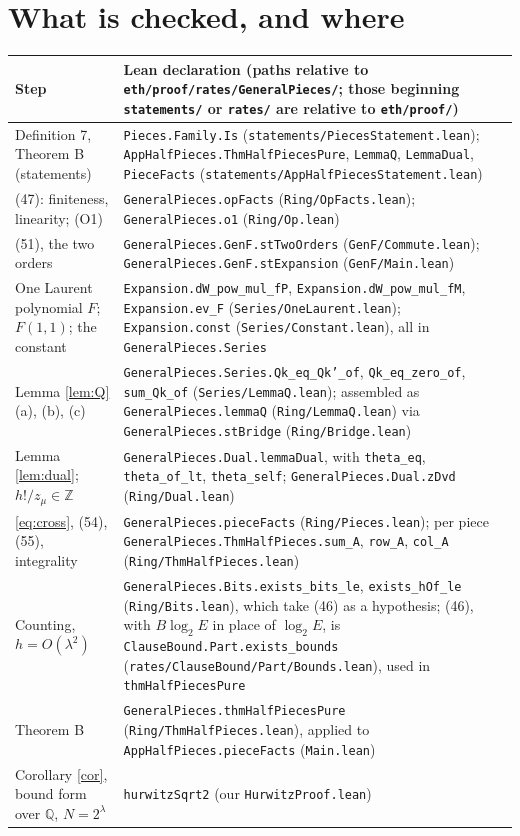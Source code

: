 \documentclass[11pt]{amsart}
\theoremstyle{remark}
\newcommand{\Q}{\mathbb{Q}}
\newcommand{\Z}{\mathbb{Z}}
\begin{document}
\section{What is checked, and where}\label{sec:map}

{\footnotesize\raggedright
\noindent\begin{tabularx}{\textwidth}{@{}>{\raggedright\arraybackslash}p{3.3cm}>{\raggedright\arraybackslash}X@{}}
\toprule
Step & Lean declaration (paths relative to \texttt{eth/proof/rates/GeneralPieces/}; those beginning \texttt{statements/} or \texttt{rates/} are relative to \texttt{eth/proof/}) \\
\midrule
Definition 7, Theorem B (statements) & \texttt{Pieces.Family.Is} (\texttt{statements/PiecesStatement.lean}); \texttt{AppHalfPieces.ThmHalfPiecesPure}, \texttt{LemmaQ}, \texttt{LemmaDual}, \texttt{PieceFacts} (\texttt{statements/AppHalfPiecesStatement.lean})\\
(47): finiteness, linearity; (O1) & \texttt{GeneralPieces.opFacts} (\texttt{Ring/OpFacts.lean}); \texttt{GeneralPieces.o1} (\texttt{Ring/Op.lean})\\
(51), the two orders & \texttt{GeneralPieces.GenF.stTwoOrders} (\texttt{GenF/Commute.lean}); \texttt{GeneralPieces.GenF.stExpansion} (\texttt{GenF/Main.lean})\\
One Laurent polynomial $F$; $F(1,1)$; the constant & \texttt{Expansion.dW\_pow\_mul\_fP}, \texttt{Expansion.dW\_pow\_mul\_fM}, \texttt{Expansion.ev\_F} (\texttt{Series/OneLaurent.lean}); \texttt{Expansion.const} (\texttt{Series/Constant.lean}), all in \texttt{GeneralPieces.Series}\\
Lemma \ref{lem:Q} (a), (b), (c) & \texttt{GeneralPieces.Series.Qk\_eq\_Qk'\_of}, \texttt{Qk\_eq\_zero\_of}, \texttt{sum\_Qk\_of} (\texttt{Series/LemmaQ.lean}); assembled as \texttt{GeneralPieces.lemmaQ} (\texttt{Ring/LemmaQ.lean}) via \texttt{GeneralPieces.stBridge} (\texttt{Ring/Bridge.lean})\\
Lemma \ref{lem:dual}; $h!/z_\mu\in\Z$ & \texttt{GeneralPieces.Dual.lemmaDual}, with \texttt{theta\_eq}, \texttt{theta\_of\_lt}, \texttt{theta\_self}; \texttt{GeneralPieces.Dual.zDvd} (\texttt{Ring/Dual.lean})\\
\eqref{eq:cross}, (54), (55), integrality & \texttt{GeneralPieces.pieceFacts} (\texttt{Ring/Pieces.lean}); per piece \texttt{GeneralPieces.ThmHalfPieces.sum\_A}, \texttt{row\_A}, \texttt{col\_A} (\texttt{Ring/ThmHalfPieces.lean})\\
Counting, $h=O(\lambda^2)$ & \texttt{GeneralPieces.Bits.exists\_bits\_le}, \texttt{exists\_hOf\_le} (\texttt{Ring/Bits.lean}), which take (46) as a hypothesis; (46), with $B\log_2E$ in place of $\log_2E$, is \texttt{ClauseBound.Part.exists\_bounds} (\texttt{rates/ClauseBound/Part/Bounds.lean}), used in \texttt{thmHalfPiecesPure}\\
Theorem B & \texttt{GeneralPieces.thmHalfPiecesPure} (\texttt{Ring/ThmHalfPieces.lean}), applied to \texttt{AppHalfPieces.pieceFacts} (\texttt{Main.lean})\\
Corollary \ref{cor}, bound form over $\Q$, $N=2^\lambda$ & \texttt{hurwitzSqrt2} (our \texttt{HurwitzProof.lean})\\
\bottomrule
\end{tabularx}\par}
\end{document}
